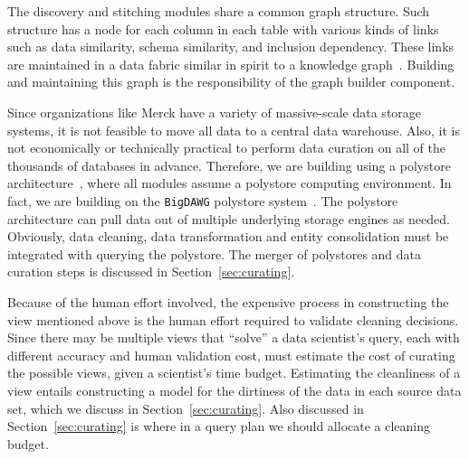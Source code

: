 The discovery and stitching modules share a common graph structure. Such structure has a node for each column in each table with various kinds of links such as data similarity, schema similarity, and inclusion dependency.  These links are maintained in a data fabric similar in spirit to a knowledge graph~\cite{DBLP:conf/semweb/AuerBKLCI07,DBLP:conf/sigmod/BollackerEPST08,DBLP:conf/www/SuchanekKW07}. Building and maintaining this graph is the responsibility of the graph builder component. 


 Since organizations like Merck have a variety of massive-scale data storage systems, it is not feasible to move all data to a central data warehouse. Also, it is not economically or technically practical to perform data curation on all of the thousands of databases in advance.  Therefore, we are building \dcv using a polystore architecture~\cite{DBLP:journals/sigmod/DugganESBHKMMMZ15}, where all modules assume a polystore computing environment. In fact, we are building on the \texttt{BigDAWG} polystore system~\cite{DBLP:journals/pvldb/ElmoreDSBCGHHKK15}. The polystore architecture can pull data out of multiple underlying storage engines as needed. Obviously, data cleaning, data transformation and entity consolidation must be integrated with querying the polystore.  The merger of polystores and data curation steps is discussed in Section~\ref{sec:curating}.



 Because of the human effort involved, the expensive process in constructing the view mentioned above is the human effort required to validate cleaning decisions. Since there may be multiple views that ``solve'' a data scientist's query, each with different accuracy and human validation cost, \dcv must estimate the cost of curating the possible views,
given a scientist's time budget. Estimating the cleanliness of a view entails constructing a model for the dirtiness of the data in each source data set, which we discuss in Section~\ref{sec:curating}. Also discussed in Section~\ref{sec:curating} is where in a query plan we should allocate a cleaning budget.



